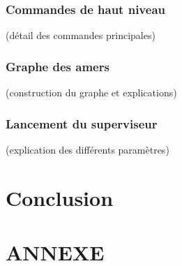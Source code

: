 \documentclass[10pt,a4paper]{article}
\begin{document}
\subsubsection{Commandes de haut niveau}

(détail des commandes principales)

\subsubsection{Graphe des amers}

(construction du graphe et explications)

\subsubsection{Lancement du superviseur}

(explication des différents paramètres)

\newpage
\section{Conclusion}
\label{sec:conclusion}

\newpage
\listoffigures
\newpage

\section*{ANNEXE}
\end{document}
